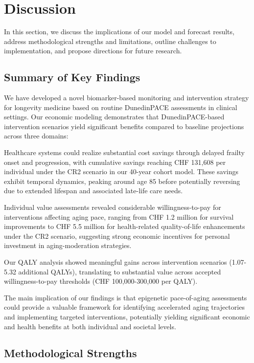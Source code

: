 \section{Discussion}

In this section, we discuss the implications of our model and forecast results, address methodological strengths and limitations, outline challenges to implementation, and propose directions for future research.

\subsection{Summary of Key Findings}

We have developed a novel biomarker-based monitoring and intervention strategy for longevity medicine based on routine DunedinPACE assessments in clinical settings. Our economic modeling demonstrates that DunedinPACE-based intervention scenarios yield significant benefits compared to baseline projections across three domains:

Healthcare systems could realize substantial cost savings through delayed frailty onset and progression, with cumulative savings reaching CHF 131,608 per individual under the CR2 scenario in our 40-year cohort model. These savings exhibit temporal dynamics, peaking around age 85 before potentially reversing due to extended lifespan and associated late-life care needs.

Individual value assessments revealed considerable willingness-to-pay for interventions affecting aging pace, ranging from CHF 1.2 million for survival improvements to CHF 5.5 million for health-related quality-of-life enhancements under the CR2 scenario, suggesting strong economic incentives for personal investment in aging-moderation strategies.

Our QALY analysis showed meaningful gains across intervention scenarios (1.07-5.32 additional QALYs), translating to substantial value across accepted willingness-to-pay thresholds (CHF 100,000-300,000 per QALY).

The main implication of our findings is that epigenetic pace-of-aging assessments could provide a valuable framework for identifying accelerated aging trajectories and implementing targeted interventions, potentially yielding significant economic and health benefits at both individual and societal levels.

\subsection{Methodological Strengths}

